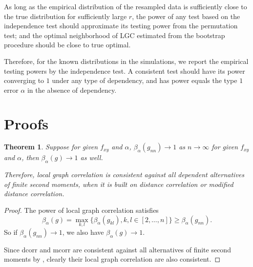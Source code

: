 \documentclass[11pt]{article}
\newtheorem{thm}{Theorem}
\begin{document}
As long as the empirical distribution of the resampled data is sufficiently close to the true distribution for sufficiently large $r$, the power of any test based on the independence test should approximate its testing power from the permutation test; and the optimal neighborhood of LGC estimated from the bootstrap procedure should be close to true optimal.

Therefore, for the known distributions in the simulations, we report the empirical testing powers by the independence test. A consistent test should have its power converging to $1$ under any type of dependency, and has power equals the type $1$ error $\alpha$ in the absence of dependency.  

\section{Proofs}
\label{sec:pfs}


\begin{thm}
Suppose for given $f_{xy}$ and $\alpha$, $\beta_{\alpha}(g_{nn}) \rightarrow 1$ as $n \rightarrow \infty$ for given $f_{xy}$ and $\alpha$, then $\beta_{\alpha}(g) \rightarrow 1$ as well.

Therefore, local graph correlation is consistent against all dependent alternatives of finite second moments, when it is built on distance correlation or modified distance correlation.
\end{thm}
\begin{proof}
The power of local graph correlation satisfies
\begin{equation}
\beta_{\alpha}(g)=\max_{k,l}\{\beta_{\alpha}(g_{kl}), k,l\in [2,\ldots,n]\} \geq \beta_{\alpha}(g_{nn}).
\end{equation}
So if $\beta_{\alpha}(g_{nn}) \rightarrow 1$, we also have $\beta_{\alpha}(g) \rightarrow 1$.

Since dcorr and mcorr are consistent against all alternatives of finite second moments by \cite{SzekelyRizzoBakirov2007, SzekelyRizzo2013a}, clearly their local graph correlation are also consistent.
\end{proof}
\end{document}
